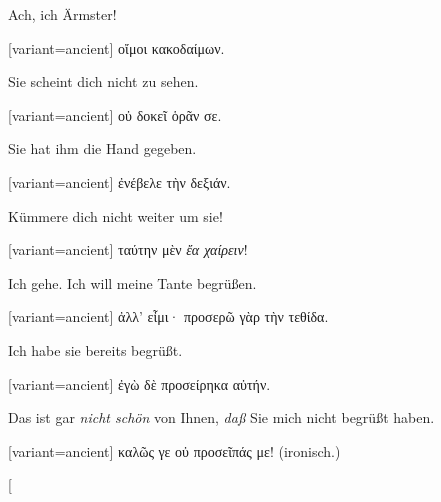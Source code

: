 Ach, ich Ärmster! 

\switchcolumn

\begin{greek}[variant=ancient]%
οἴμοι κακοδαίμων.

\end{greek}%
\switchcolumn*

Sie scheint dich nicht zu sehen. 

\switchcolumn

\begin{greek}[variant=ancient]%
οὐ δοκεῖ ὁρᾶν σε.

\end{greek}%
\switchcolumn*

Sie hat ihm die Hand gegeben. 

\switchcolumn

\begin{greek}[variant=ancient]%
ἐνέβελε τὴν δεξιάν.

\end{greek}%
\switchcolumn*

Kümmere dich nicht weiter um sie! 

\switchcolumn

\begin{greek}[variant=ancient]%
ταύτην μὲν \emph{ἔα χαίρειν}!

\end{greek}%
\switchcolumn*

Ich gehe. Ich will meine Tante begrüßen. 

\switchcolumn

\begin{greek}[variant=ancient]%
ἀλλ' εἶμι· προσερῶ γὰρ τὴν τεθίδα.

\end{greek}%
\switchcolumn*

Ich habe sie bereits begrüßt. 

\switchcolumn

\begin{greek}[variant=ancient]%
ἐγὼ δὲ προσείρηκα αὐτήν.

\end{greek}%
\switchcolumn*

Das ist gar \emph{nicht schön} von Ihnen, \emph{daß} Sie mich nicht
begrüßt haben.

\switchcolumn

\begin{greek}[variant=ancient]%
καλῶς γε οὐ προσεῖπάς με! \textgerman[spelling=old,babelshorthands=true]{(ironisch.)}

\end{greek}%
\switchcolumn*[


